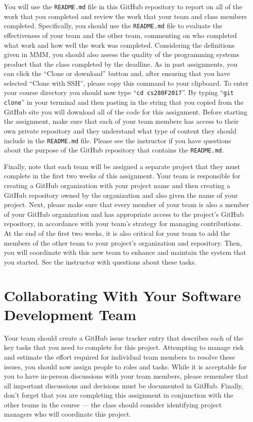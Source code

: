 \documentclass[11pt]{article}
\newcommand{\reflection}{\lstinline{README.md}}
\newcommand{\command}[1]{``\lstinline{#1}''}
\begin{document}
You will use the \reflection{} file in this GitHub repository to report on all of the work that you completed and review
the work that your team and class members completed. Specifically, you should use the \reflection{} file to evaluate the
effectiveness of your team and the other team, commenting on who completed what work and how well the work was
completed. Considering the definitions given in MMM, you should also assess the quality of the programming systems
product that the class completed by the deadline. As in past assignments, you can click the ``Clone or download'' button
and, after ensuring that you have selected ``Clone with SSH'', please copy this command to your clipboard. To enter your
course directory you should now type \command{cd cs280F2017}. By typing \command{git clone} in your terminal and then
pasting in the string that you copied from the GitHub site you will download all of the code for this assignment. Before
starting the assignment, make sure that each of your team members has access to their own private repository and they
understand what type of content they should include in the \reflection{} file. Please see the instructor if you have
questions about the purpose of the GitHub repository that contains the \reflection{}.

Finally, note that each team will be assigned a separate project that they must complete in the first two weeks of this
assignment. Your team is responsible for creating a GitHub organization with your project name and then creating a
GitHub repository owned by the organization and also given the name of your project. Next, please make sure that every
member of your team is also a member of your GitHub organization and has appropriate access to the project's GitHub
repository, in accordance with your team's strategy for managing contributions. At the end of the first two weeks, it is
also critical for your team to add the members of the other team to your project's organization and repository. Then,
you will coordinate with this new team to enhance and maintain the system that you started. See the instructor
with questions about these tasks.

\section*{Collaborating With Your Software Development Team}

Your team should create a GitHub issue tracker entry that describes each of the key tasks that you need to complete for
this project. Attempting to manage risk and estimate the effort required for individual team members to resolve these
issues, you should now assign people to roles and tasks. While it is acceptable for you to have in-person discussions
with your team members, please remember that all important discussions and decisions must be documented in GitHub.
Finally, don't forget that you are completing this assignment in conjunction with the other teams in the course --- the
class should consider identifying project managers who will coordinate this project.
\end{document}
